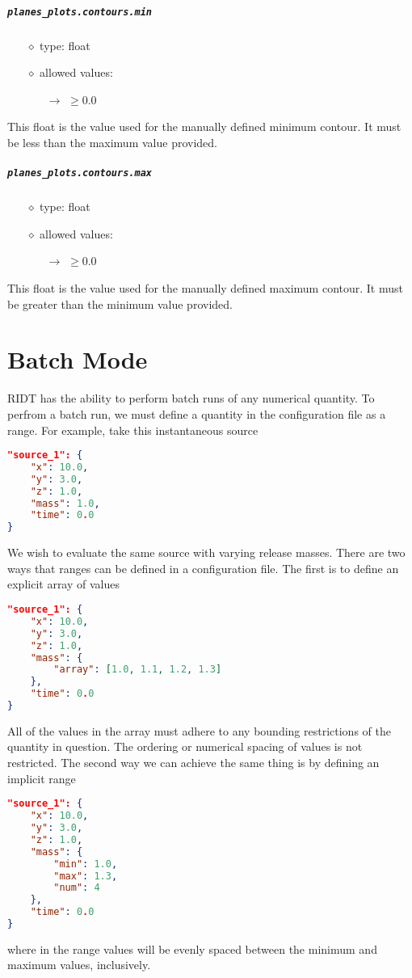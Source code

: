 \documentclass[]{article}
\def\code#1{\texttt{#1}}
\begin{document}
\subparagraph{\code{planes\_plots.contours.min}}
\begin{itemize}
    \item[$\diamond$] type: float 
    \item[$\diamond$] allowed values:
    \begin{itemize}
        \item[$\rightarrow$] $\geq0.0$
    \end{itemize}
\end{itemize}
This float is the value used for the manually defined minimum contour. It must
be less than the maximum value provided.

\subparagraph{\code{planes\_plots.contours.max}}
\begin{itemize}
    \item[$\diamond$] type: float 
    \item[$\diamond$] allowed values:
    \begin{itemize}
        \item[$\rightarrow$] $\geq0.0$
    \end{itemize}
\end{itemize}
This float is the value used for the manually defined maximum contour. It must
be greater than the minimum value provided.

\section{Batch Mode}
RIDT has the ability to perform batch runs of any numerical quantity. To perfrom
a batch run, we must define a quantity in the configuration file as a range.
For example, take this instantaneous source\\
\begin{lstlisting}[language=json,firstnumber=1]
"source_1": {
    "x": 10.0,
    "y": 3.0,
    "z": 1.0,
    "mass": 1.0,
    "time": 0.0
}
\end{lstlisting}
\medskip
We wish to evaluate the same source with varying release masses. There are two
ways that ranges can be defined in a configuration file. The first is to define
an explicit array of values\\
\begin{lstlisting}[language=json,firstnumber=1]
"source_1": {
    "x": 10.0,
    "y": 3.0,
    "z": 1.0,
    "mass": {
        "array": [1.0, 1.1, 1.2, 1.3]
    },
    "time": 0.0
}
\end{lstlisting}
\medskip
All of the values in the array must adhere to any bounding restrictions of the
quantity in question. The ordering or numerical spacing of values is not
restricted. The second way we can achieve the same thing is by defining an
implicit range\\
\begin{lstlisting}[language=json,firstnumber=1]
"source_1": {
    "x": 10.0,
    "y": 3.0,
    "z": 1.0,
    "mass": {
        "min": 1.0,
        "max": 1.3,
        "num": 4
    },
    "time": 0.0
}
\end{lstlisting}
\medskip
where in the range values will be evenly spaced between the minimum and maximum
values, inclusively.\\
\end{document}
